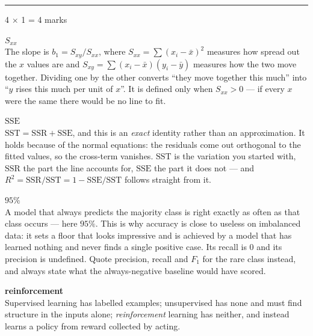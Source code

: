 \documentclass[10pt,a4paper]{article}
\newcommand{\parthead}[2]{\vspace{2pt}\noindent\rule{\linewidth}{0.4pt}\par\vspace{2pt}%
  \noindent{\bfseries Part #1}\hfill{\small #2}\par\vspace{1pt}}
\newcommand{\sol}[1]{\textbf{#1}}
\begin{document}
\vspace{3pt}

\parthead{B --- Fill in the blanks}{4 $\times$ 1 = 4 marks}

\begin{sB}

  \item \sol{$S_{xx}$}\\ The slope is $b_1 = S_{xy}/S_{xx}$, where $S_{xx} = \sum(x_i - \bar x)^2$ measures how spread out the $x$ values are and $S_{xy} = \sum(x_i - \bar x)(y_i - \bar y)$ measures how the two move together. Dividing one by the other converts ``they move together this much'' into ``$y$ rises this much per unit of $x$''. It is defined only when $S_{xx} > 0$ --- if every $x$ were the same there would be no line to fit.

  \item \sol{$\mathrm{SSE}$}\\ $\mathrm{SST} = \mathrm{SSR} + \mathrm{SSE}$, and this is an \emph{exact} identity rather than an approximation. It holds because of the normal equations: the residuals come out orthogonal to the fitted values, so the cross-term vanishes. $\mathrm{SST}$ is the variation you started with, $\mathrm{SSR}$ the part the line accounts for, $\mathrm{SSE}$ the part it does not --- and $R^2 = \mathrm{SSR}/\mathrm{SST} = 1 - \mathrm{SSE}/\mathrm{SST}$ follows straight from it.

  \item \sol{$95\%$}\\ A model that always predicts the majority class is right exactly as often as that class occurs --- here $95\%$. This is why accuracy is close to useless on imbalanced data: it sets a floor that looks impressive and is achieved by a model that has learned nothing and never finds a single positive case. Its recall is $0$ and its precision is undefined. Quote precision, recall and $F_1$ for the rare class instead, and always state what the always-negative baseline would have scored.

  \item \sol{reinforcement}\\ Supervised learning has labelled examples; unsupervised has none and must find structure in the inputs alone; \emph{reinforcement} learning has neither, and instead learns a policy from reward collected by acting.

\end{sB}

\newpage
\end{document}
